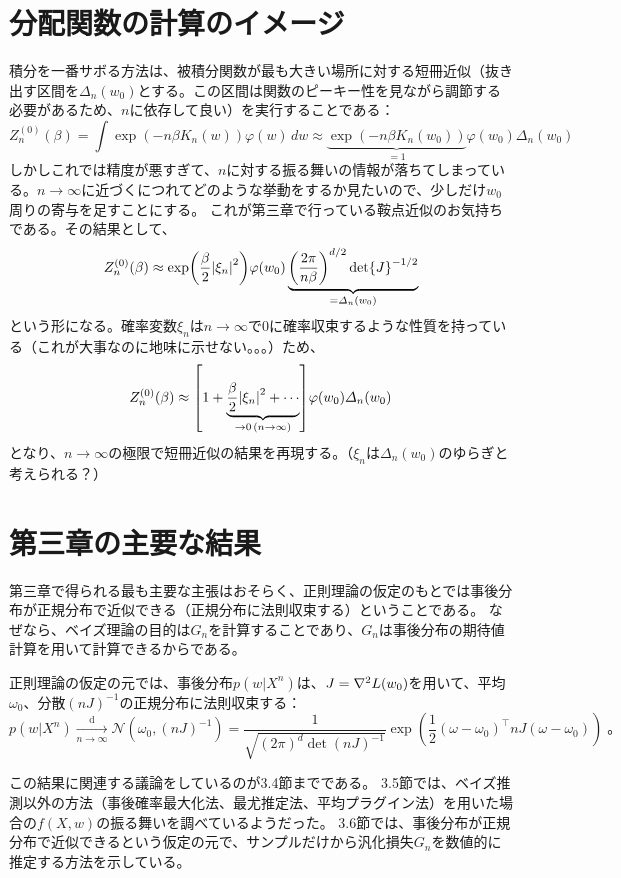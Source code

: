 \documentclass[dvipdfmx]{jsarticle}
\begin{document}
\section{分配関数の計算のイメージ}
積分を一番サボる方法は、被積分関数が最も大きい場所に対する短冊近似（抜き出す区間を$\varDelta_n(w_0)$とする。この区間は関数のピーキー性を見ながら調節する必要があるため、$n$に依存して良い）を実行することである：
\begin{equation}
    Z_n^{(0)}(\beta) = \int\exp(-n\beta K_n(w))\varphi(w)\,dw \approx \underbrace{\exp(-n\beta K_n(w_0))}_{=1}\varphi(w_0)\varDelta_n(w_0)
\end{equation}
しかしこれでは精度が悪すぎて、$n$に対する振る舞いの情報が落ちてしまっている。$n\to\infty$に近づくにつれてどのような挙動をするか見たいので、少しだけ$w_0$周りの寄与を足すことにする。
これが第三章で行っている鞍点近似のお気持ちである。その結果として、
\begin{equation}
    Z_n^{(0)}(\beta) \approx \exp(\frac{\beta}{2}\abs{\xi_n}^2)\varphi(w_0)\underbrace{\qty(\frac{2\pi}{n\beta})^{d/2}\det{J}^{-1/2}}_{=\varDelta_n(w_0)}
\end{equation}
という形になる。確率変数$\xi_n$は$n\to\infty$で$0$に確率収束するような性質を持っている（これが大事なのに地味に示せない。。。）ため、
\begin{equation}
    Z_n^{(0)}(\beta) \approx \qty[1+\underbrace{\frac{\beta}{2}\abs{\xi_n}^2+\cdots}_{\to 0\,(n\to\infty)}]\varphi(w_0)\varDelta_n(w_0)
\end{equation}
となり、$n\to\infty$の極限で短冊近似の結果を再現する。（$\xi_n$は$\varDelta_n(w_0)$のゆらぎと考えられる？）


\section{第三章の主要な結果}
第三章で得られる最も主要な主張はおそらく、正則理論の仮定のもとでは事後分布が正規分布で近似できる（正規分布に法則収束する）ということである。
なぜなら、ベイズ理論の目的は$G_n$を計算することであり、$G_n$は事後分布の期待値計算を用いて計算できるからである。
\begin{mybox}[事後分布が正規分布に法則収束する]
    正則理論の仮定の元では、事後分布$p(w|X^n)$は、$J=\laplacian L(w_0)$を用いて、平均$\omega_0$、分散$(nJ)^{-1}$の正規分布に法則収束する：
\begin{equation}
    p(w|X^n) \xrightarrow[n\to\infty]{\mathrm{d}} \mathcal{N}(\omega_0, (nJ)^{-1})
    = \frac{1}{\sqrt{(2\pi)^{d}\det{(nJ)^{-1}}}}\exp(\frac{1}{2}(\omega-\omega_0)^{\top}nJ(\omega-\omega_0))\;。
\end{equation}
\end{mybox}
この結果に関連する議論をしているのが3.4節までである。
3.5節では、ベイズ推測以外の方法（事後確率最大化法、最尤推定法、平均プラグイン法）を用いた場合の$f(X,w)$の振る舞いを調べているようだった。
3.6節では、事後分布が正規分布で近似できるという仮定の元で、サンプルだけから汎化損失$G_n$を数値的に推定する方法を示している。
\end{document}
